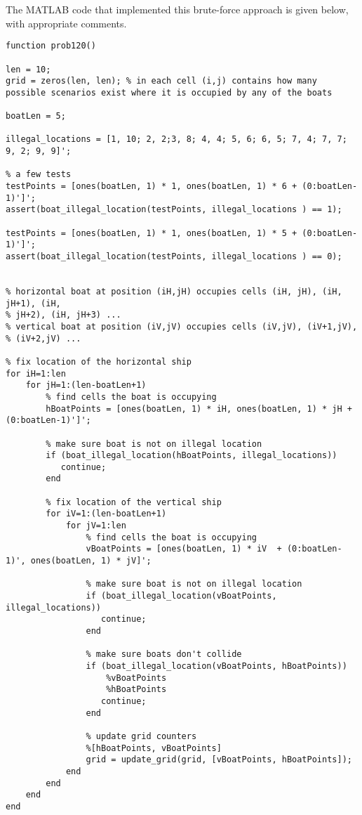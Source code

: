 \documentclass[11pt,a4paper,oneside]{report}
\begin{document}
The MATLAB code that implemented this brute-force approach is given below, with appropriate comments. 
\begin{lstlisting}
function prob120()

len = 10;
grid = zeros(len, len); % in each cell (i,j) contains how many possible scenarios exist where it is occupied by any of the boats

boatLen = 5;

illegal_locations = [1, 10; 2, 2;3, 8; 4, 4; 5, 6; 6, 5; 7, 4; 7, 7; 9, 2; 9, 9]';

% a few tests
testPoints = [ones(boatLen, 1) * 1, ones(boatLen, 1) * 6 + (0:boatLen-1)']'; 
assert(boat_illegal_location(testPoints, illegal_locations ) == 1);

testPoints = [ones(boatLen, 1) * 1, ones(boatLen, 1) * 5 + (0:boatLen-1)']'; 
assert(boat_illegal_location(testPoints, illegal_locations ) == 0);


% horizontal boat at position (iH,jH) occupies cells (iH, jH), (iH, jH+1), (iH,
% jH+2), (iH, jH+3) ...
% vertical boat at position (iV,jV) occupies cells (iV,jV), (iV+1,jV),
% (iV+2,jV) ...

% fix location of the horizontal ship
for iH=1:len
    for jH=1:(len-boatLen+1)
        % find cells the boat is occupying
        hBoatPoints = [ones(boatLen, 1) * iH, ones(boatLen, 1) * jH + (0:boatLen-1)']';  
        
        % make sure boat is not on illegal location
        if (boat_illegal_location(hBoatPoints, illegal_locations))
           continue; 
        end    
        
        % fix location of the vertical ship
        for iV=1:(len-boatLen+1)
            for jV=1:len
                % find cells the boat is occupying
                vBoatPoints = [ones(boatLen, 1) * iV  + (0:boatLen-1)', ones(boatLen, 1) * jV]'; 
                        
                % make sure boat is not on illegal location
                if (boat_illegal_location(vBoatPoints, illegal_locations))
                   continue; 
                end    
                
                % make sure boats don't collide
                if (boat_illegal_location(vBoatPoints, hBoatPoints))
                    %vBoatPoints
                    %hBoatPoints
                   continue; 
                end

                % update grid counters
                %[hBoatPoints, vBoatPoints]
                grid = update_grid(grid, [vBoatPoints, hBoatPoints]);
            end
        end
    end
end



\end{lstlisting}
\end{document}
